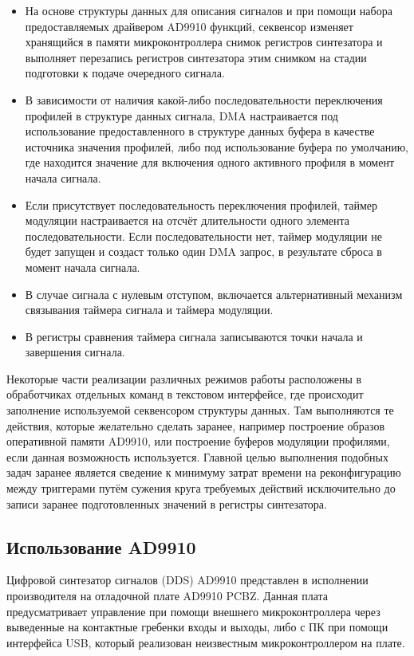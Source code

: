 \documentclass[rusmathsym, eqnumwithinsec, amspack, hyperref]{bomgost}
\begin{document}
\begin{itemize}
	\item На основе структуры данных для описания сигналов и при помощи набора предоставляемых драйвером AD9910 функций, секвенсор изменяет хранящийся в памяти микроконтроллера снимок регистров синтезатора и выполняет перезапись регистров синтезатора этим снимком на стадии подготовки к подаче очередного сигнала.
	\item В зависимости от наличия какой-либо последовательности переключения профилей в структуре данных сигнала, DMA настраивается под использование предоставленного в структуре данных буфера в качестве источника значения профилей, либо под использование буфера по умолчанию, где находится значение для включения одного активного профиля в момент начала сигнала.
	\item Если присутствует последовательность переключения профилей, таймер модуляции настраивается на отсчёт длительности одного элемента последовательности. Если последовательности нет, таймер модуляции не будет запущен и создаст только один DMA запрос, в результате сброса в момент начала сигнала.
	\item В случае сигнала с нулевым отступом, включается альтернативный механизм связывания таймера сигнала и таймера модуляции. 
	\item В регистры сравнения таймера сигнала записываются точки начала и завершения сигнала.
\end{itemize}

Некоторые части реализации различных режимов работы расположены в обработчиках отдельных команд в текстовом интерфейсе, где происходит заполнение используемой секвенсором структуры данных. Там выполняются те действия, которые желательно сделать заранее, например построение образов оперативной памяти AD9910, или построение буферов модуляции профилями, если данная возможность используется. Главной целью выполнения подобных задач заранее является сведение к минимуму затрат времени на реконфигурацию между триггерами путём сужения круга требуемых действий исключительно до записи заранее подготовленных значений в регистры синтезатора.

\subsection{Использование AD9910}

Цифровой синтезатор сигналов (DDS) AD9910 представлен в исполнении производителя на отладочной плате AD9910 PCBZ. Данная плата предусматривает управление при помощи внешнего микроконтроллера через выведенные на контактные гребенки входы и выходы, либо с ПК при помощи интерфейса USB, который реализован неизвестным микроконтроллером на плате.
\end{document}
